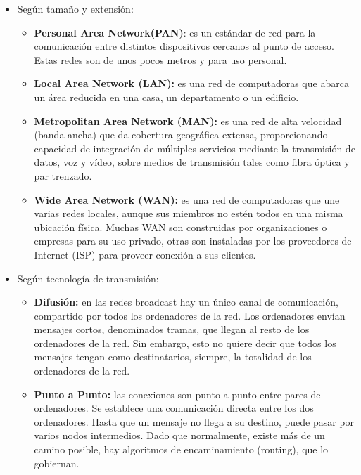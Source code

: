 \documentclass[a4paper,11pt]{article}
\begin{document}
\begin{itemize}
\item Según tamaño y extensión:
	\begin{itemize}
		\item \textbf{Personal Area Network(PAN)}: es un estándar de red para la comunicación entre distintos dispositivos cercanos al punto de acceso. Estas redes son de unos pocos metros y para uso personal.
		
		\item \textbf{Local Area Network (LAN):} es una red de computadoras que abarca un área reducida en una casa, un departamento o un edificio.
		
		\item \textbf{Metropolitan Area Network (MAN):} es una red de alta velocidad (banda ancha) que da cobertura geográfica extensa, proporcionando capacidad de integración de múltiples servicios mediante la transmisión de datos, voz y vídeo, sobre medios de transmisión tales como fibra óptica y par trenzado.
		
		\item \textbf{Wide Area Network (WAN):} es una red de computadoras que une varias redes locales, aunque sus miembros no estén todos en una misma ubicación física. Muchas WAN son construidas por organizaciones o empresas para su uso privado, otras son instaladas por los proveedores de Internet (ISP) para proveer conexión a sus clientes.
	\end{itemize}
	
\item Según tecnología de transmisión:
	
	\begin{itemize}
		\item \textbf{Difusión:} en las redes broadcast hay un único canal de comunicación, compartido por todos los ordenadores de la red. Los ordenadores envían mensajes cortos, denominados tramas, que llegan al resto de los ordenadores de la red. Sin embargo, esto no quiere decir que todos los mensajes tengan como destinatarios, siempre, la totalidad de los ordenadores de la red.
		
		\item \textbf{Punto a Punto:} las conexiones son punto a punto entre pares de ordenadores. Se establece una comunicación directa entre los dos ordenadores. Hasta que un mensaje no llega a su destino, puede pasar por varios nodos intermedios. Dado que normalmente, existe más de un camino posible, hay algoritmos de encaminamiento (routing), que lo gobiernan.
	\end{itemize}
	

\end{itemize}
\end{document}

